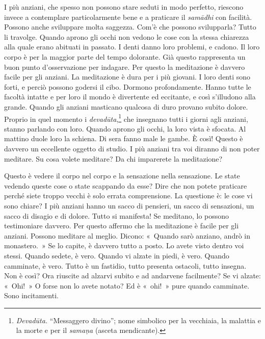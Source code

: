 I più anziani, che spesso non possono stare seduti in modo perfetto,
riescono invece a contemplare particolarmente bene e a praticare il
\emph{samādhi} con facilità. Possono anche sviluppare molta saggezza.
Com'è che possono svilupparla? Tutto li travolge. Quando aprono gli
occhi non vedono le cose con la stessa chiarezza alla quale erano
abituati in passato. I denti danno loro problemi, e cadono. Il loro
corpo è per la maggior parte del tempo dolorante. Già questo rappresenta
un buon punto d'osservazione per indagare. Per questo la meditazione è
davvero facile per gli anziani. La meditazione è dura per i più giovani.
I loro denti sono forti, e perciò possono godersi il cibo. Dormono
profondamente. Hanno tutte le facoltà intatte e per loro il mondo è
divertente ed eccitante, e così s'illudono alla grande. Quando gli
anziani masticano qualcosa di duro provano subito dolore. Proprio in
quel momento i \emph{devadūta},\footnote{\emph{Devadūta.} ``Messaggero divino''; nome simbolico per la
  vecchiaia, la malattia e la morte e per il \emph{samaṇa} (asceta
  mendicante).} che insegnano tutti i giorni agli anziani, stanno
parlando con loro. Quando aprono gli occhi, la loro vista è sfocata. Al
mattino duole loro la schiena. Di sera fanno male le gambe. È così!
Questo è davvero un eccellente oggetto di studio. I più anziani tra voi
diranno di non poter meditare. Su cosa volete meditare? Da chi
imparerete la meditazione?

Questo è vedere il corpo nel corpo e la sensazione nella sensazione. Le
state vedendo queste cose o state scappando da esse? Dire che non potete
praticare perché siete troppo vecchi è solo errata comprensione. La
questione è: le cose vi sono chiare? I più anziani hanno un sacco di
pensieri, un sacco di sensazioni, un sacco di disagio e di dolore. Tutto
si manifesta! Se meditano, lo possono testimoniare davvero. Per questo
affermo che la meditazione è facile per gli anziani. Possono meditare al
meglio. Dicono: «~Quando sarò anziano, andrò in monastero.~» Se lo
capite, è davvero tutto a posto. Lo avete visto dentro voi stessi.
Quando sedete, è vero. Quando vi alzate in piedi, è vero. Quando
camminate, è vero. Tutto è un fastidio, tutto presenta ostacoli, tutto
insegna. Non è così? Ora riuscite ad alzarvi subito e ad andarvene
facilmente? Se vi alzate: «~Ohi!~» O forse non lo avete notato? Ed è
«~ohi!~» pure quando camminate. Sono incitamenti.

